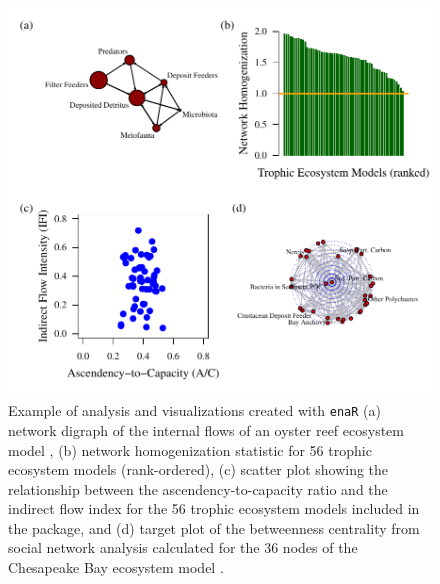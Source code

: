 \documentclass[11pt]{article}
\newcommand{\enaR}{\texttt{enaR}}
\begin{document}
\begin{figure}[h]
\includegraphics[scale=1]{../figures/enaR_plot_example.pdf}
\caption{Example of analysis and visualizations created with \enaR\:
  (a) network digraph of the internal flows of an oyster reef
  ecosystem model \citep{dame81}, (b) network homogenization statistic
  for 56 trophic ecosystem models (rank-ordered), (c) scatter plot
  showing the relationship between the ascendency-to-capacity ratio
  and the indirect flow index for the 56 trophic ecosystem models
  included in the package, and (d) target plot of the betweenness centrality from
  social network analysis calculated for the 36 nodes of the
  Chesapeake Bay ecosystem model \citep{baird89}. } \label{fig:example}
\end{figure}
\end{document}
